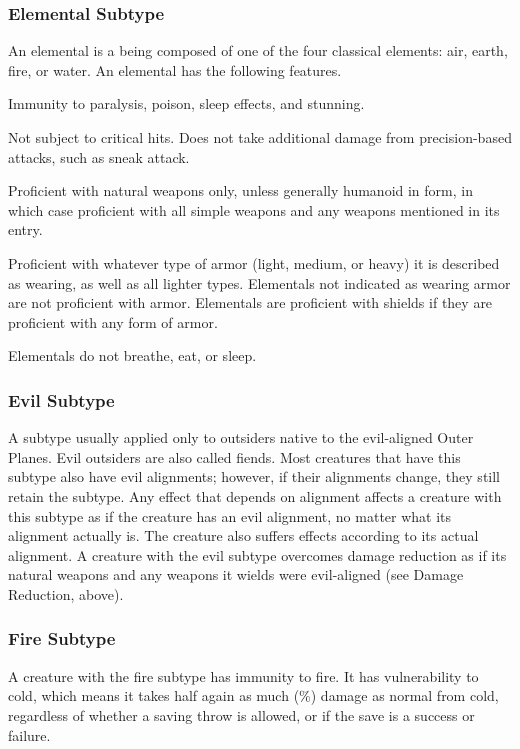 {\subsubsection{Elemental Subtype} An elemental is a being composed of one of the four classical elements: air, earth, fire, or water.
 An elemental has the following features.
\begin{itemize*}
\item Immunity to paralysis, poison, sleep effects, and stunning.
\item Not subject to critical hits. Does not take additional damage from precision-based attacks, such as sneak attack.
\item Proficient with natural weapons only, unless generally humanoid in form, in which case proficient with all simple weapons and any weapons mentioned in its entry.
\item Proficient with whatever type of armor (light, medium, or heavy) it is described as wearing, as well as all lighter types. Elementals not indicated as wearing armor are not proficient with armor. Elementals are proficient with shields if they are proficient with any form of armor.
\item Elementals do not breathe, eat, or sleep.
\end{itemize*}

\subsubsection{Evil Subtype} A subtype usually applied only to outsiders native to the evil-aligned Outer Planes. Evil outsiders are also called fiends. Most creatures that have this subtype also have evil alignments; however, if their alignments change, they still retain the subtype. Any effect that depends on alignment affects a creature with this subtype as if the creature has an evil alignment, no matter what its alignment actually is. The creature also suffers effects according to its actual alignment. A creature with the evil subtype overcomes damage reduction as if its natural weapons and any weapons it wields were evil-aligned (see Damage Reduction, above).

\subsubsection{Fire Subtype} A creature with the fire subtype has immunity to fire. It has vulnerability to cold, which means it takes half again as much (\%) damage as normal from cold, regardless of whether a saving throw is allowed, or if the save is a success or failure.

}
